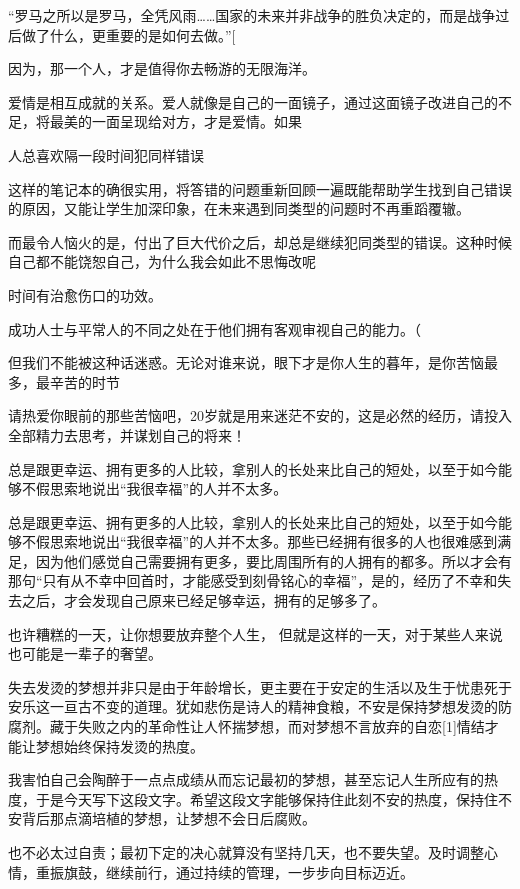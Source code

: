\documentclass[UTF8,a4paper,8pt]{ctexart}
\begin{document}
 
 “罗马之所以是罗马，全凭风雨……国家的未来并非战争的胜负决定的，而是战争过后做了什么，更重要的是如何去做。”[
 
 
 因为，那一个人，才是值得你去畅游的无限海洋。
 
 
 爱情是相互成就的关系。爱人就像是自己的一面镜子，通过这面镜子改进自己的不足，将最美的一面呈现给对方，才是爱情。如果
 
 
 人总喜欢隔一段时间犯同样错误
 
 
 这样的笔记本的确很实用，将答错的问题重新回顾一遍既能帮助学生找到自己错误的原因，又能让学生加深印象，在未来遇到同类型的问题时不再重蹈覆辙。
 
 
 而最令人恼火的是，付出了巨大代价之后，却总是继续犯同类型的错误。这种时候自己都不能饶恕自己，为什么我会如此不思悔改呢
 
 
 时间有治愈伤口的功效。
 
 成功人士与平常人的不同之处在于他们拥有客观审视自己的能力。（
 
 
 但我们不能被这种话迷惑。无论对谁来说，眼下才是你人生的暮年，是你苦恼最多，最辛苦的时节
 
 请热爱你眼前的那些苦恼吧，20岁就是用来迷茫不安的，这是必然的经历，请投入全部精力去思考，并谋划自己的将来！
 
 
 总是跟更幸运、拥有更多的人比较，拿别人的长处来比自己的短处，以至于如今能够不假思索地说出“我很幸福”的人并不太多。
 
 
 总是跟更幸运、拥有更多的人比较，拿别人的长处来比自己的短处，以至于如今能够不假思索地说出“我很幸福”的人并不太多。那些已经拥有很多的人也很难感到满足，因为他们感觉自己需要拥有更多，要比周围所有的人拥有的都多。所以才会有那句“只有从不幸中回首时，才能感受到刻骨铭心的幸福”，是的，经历了不幸和失去之后，才会发现自己原来已经足够幸运，拥有的足够多了。
 
 
 也许糟糕的一天，让你想要放弃整个人生， 但就是这样的一天，对于某些人来说也可能是一辈子的奢望。
 
 
 失去发烫的梦想并非只是由于年龄增长，更主要在于安定的生活以及生于忧患死于安乐这一亘古不变的道理。犹如悲伤是诗人的精神食粮，不安是保持梦想发烫的防腐剂。藏于失败之内的革命性让人怀揣梦想，而对梦想不言放弃的自恋[1]情结才能让梦想始终保持发烫的热度。
 
 
 我害怕自己会陶醉于一点点成绩从而忘记最初的梦想，甚至忘记人生所应有的热度，于是今天写下这段文字。希望这段文字能够保持住此刻不安的热度，保持住不安背后那点滴培植的梦想，让梦想不会日后腐败。
 
 
 也不必太过自责；最初下定的决心就算没有坚持几天，也不要失望。及时调整心情，重振旗鼓，继续前行，通过持续的管理，一步步向目标迈近。
 
\end{document}
